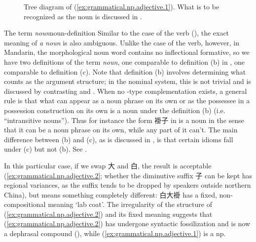 \documentclass[UTF8, a4paper, oneside, scheme=plain, 12pt]{ctexrep}
\newcommand*{\term}[1]{\emph{#1}}
\newcommand{\translate}[1]{`#1'}
\begin{document}
\begin{figure}[H]
    \centering
    {
        \small
        
    }
    \caption{Tree diagram of (\ref{ex:grammatical.np.adjective.1}).
    What is to be recognized as the noun is discussed in .}
    \label{fig:grammatical.np.adjective.1}
\end{figure}

\begin{theorybox}{The term \term{noun}}{noun-definition}
    Similar to the case of the verb (),
    the exact meaning of \term{a noun} is also ambiguous.
    Unlike the case of the verb, however,
    in Mandarin, the morphological noun word contains no inflectional formative,
    so we have two definitions of the term \term{noun},
    one comparable to definition (b) in ,
    one comparable to definition (c).
    Note that definition (b) involves determining what counts as the argument structure;
    in the nominal system, this is not trivial
    and is discussed by contrasting 
    and .
    When no -type complementation exists,
    a general rule is that what can appear as a noun phrase on its own
    or as the possessee in a possession construction on its own 
    is a noun under the definition (b) (i.e. ``intransitive nouns'').
    Thus for instance the form 褂子 in 
    is a noun in the sense that it can be a noun phrase on its own,
    while any part of it can't.
    The main difference between (b) and (c), as is discussed in ,
    is that certain idioms fall under (c) but not (b).
    See .
\end{theorybox}

In this particular case, 
if we swap 大 and 白, the result is acceptable (\ref{ex:grammatical.np.adjective.2};
whether the diminutive suffix 子 can be kept has regional variances,
as the suffix tends to be dropped by speakers outside northern China),
but means something completely different:
白大褂 has a fixed, non-compositional meaning \translate{lab coat}.
The irregularity of the structure of (\ref{ex:grammatical.np.adjective.2})
and its fixed meaning suggests that (\ref{ex:grammatical.np.adjective.2}) has undergone syntactic fossilization
and is now a dephrasal compound (),
while (\ref{ex:grammatical.np.adjective.1}) is a \ac{np}.
\end{document}
